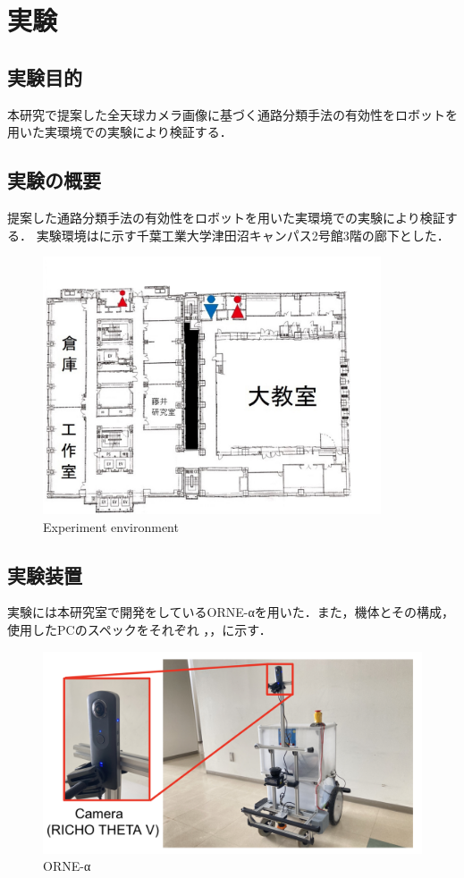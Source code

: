 \documentclass[../main]{subfiles}
\begin{document}
\setcounter{secnumdepth}{3}
    \chapter{実験}
    \section{実験目的}
        本研究で提案した全天球カメラ画像に基づく通路分類手法の有効性をロボットを用いた実環境での実験により検証する．
    \section{実験の概要}
        提案した通路分類手法の有効性をロボットを用いた実環境での実験により検証する．
        実験環境はに示す千葉工業大学津田沼キャンパス2号館3階の廊下とした．
        \begin{figure}[H]
         \centering
         \includegraphics[width=10cm]{../images/MAP_Tsudanuma2-3.png}
         \caption{Experiment environment}
         \label{figure::3floor_map}
        \end{figure}

    \section{実験装置}
        実験には本研究室で開発をしているORNE-αを用いた．また，機体とその構成，使用したPCのスペックをそれぞれ
        ，，に示す．

        \begin{figure}[H]
        \centering
        \includegraphics[width=13cm]{../images/experimental_machine_wide.png}
        \caption{ORNE-α}
        \label{figure::robot_image}
        \end{figure}
\end{document}
